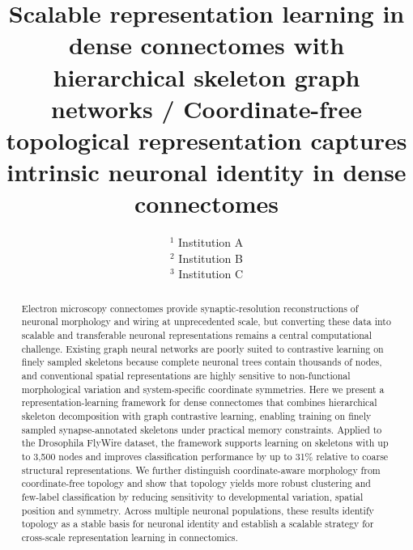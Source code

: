 \documentclass{article}
\title{Scalable representation learning in dense connectomes with hierarchical skeleton graph networks / Coordinate-free topological representation captures intrinsic neuronal identity in dense connectomes}
\author{
}
\date{
    $^1$ Institution A \\
    $^2$ Institution B \\
    $^3$ Institution C \\
}
\begin{document}
\maketitle
\begin{abstract}
Electron microscopy connectomes provide synaptic-resolution reconstructions of neuronal morphology and wiring at unprecedented scale, but converting these data into scalable and transferable neuronal representations remains a central computational challenge. Existing graph neural networks are poorly suited to contrastive learning on finely sampled skeletons because complete neuronal trees contain thousands of nodes, and conventional spatial representations are highly sensitive to non-functional morphological variation and system-specific coordinate symmetries. Here we present a representation-learning framework for dense connectomes that combines hierarchical skeleton decomposition with graph contrastive learning, enabling training on finely sampled synapse-annotated skeletons under practical memory constraints. Applied to the Drosophila FlyWire dataset, the framework supports learning on skeletons with up to 3,500 nodes and improves classification performance by up to 31\% relative to coarse structural representations. We further distinguish coordinate-aware morphology from coordinate-free topology and show that topology yields more robust clustering and few-label classification by reducing sensitivity to developmental variation, spatial position and symmetry. Across multiple neuronal populations, these results identify topology as a stable basis for neuronal identity and establish a scalable strategy for cross-scale representation learning in connectomics.



\end{abstract}
\end{document}
